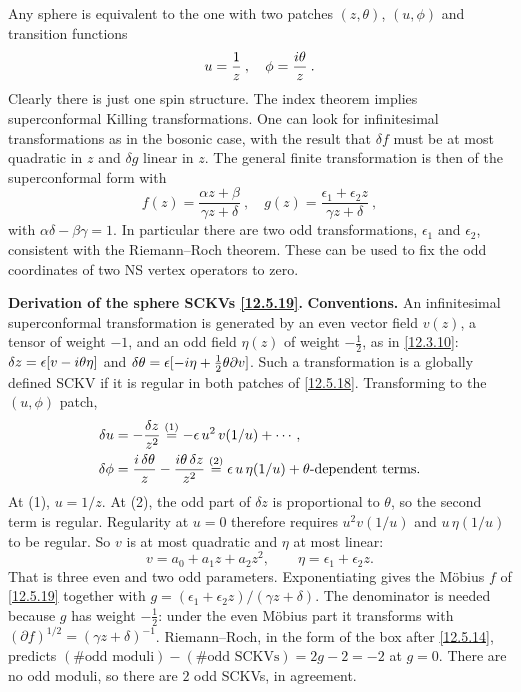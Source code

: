 Any sphere is equivalent to the one with two patches $(z,\theta)$, $(u,\phi)$ and transition functions
\begin{equation}
	u = \frac{1}{z} \:, \quad \phi = \frac{i\theta}{z} \:. \label{12.5.18}
\end{equation}
Clearly there is just one spin structure. The index theorem implies superconformal Killing transformations. One can look for infinitesimal transformations as in the bosonic case, with the result that $\delta f$ must be at most quadratic in $z$ and $\delta g$ linear in $z$. The general finite transformation is then of the superconformal form with
\begin{equation}
	f(z) = \frac{\alpha z + \beta}{\gamma z + \delta} \:, \quad g(z) = \frac{\epsilon_1 + \epsilon_2 z}{\gamma z + \delta} \:, \label{12.5.19}
\end{equation}
with $\alpha\delta - \beta\gamma = 1$. In particular there are two odd transformations, $\epsilon_1$ and $\epsilon_2$, consistent with the Riemann--Roch theorem. These can be used to fix the odd coordinates of two NS vertex operators to zero.

\begin{tcolorbox}[breakable]
	\begin{remark}
		\textbf{Derivation of the sphere SCKVs \eqref{12.5.19}.} \textbf{Conventions.} An infinitesimal superconformal transformation is generated by an even vector field $v(z)$, a tensor of weight $-1$, and an odd field $\eta(z)$ of weight $-\frac12$, as in \eqref{12.3.10}: $\delta z=\epsilon[v-i\theta\eta]$ and $\delta\theta=\epsilon[-i\eta+\frac12\theta\partial v]$. Such a transformation is a globally defined SCKV if it is regular in both patches of \eqref{12.5.18}. Transforming to the $(u,\phi)$ patch,
		\begin{align*}
			\delta u&=-\frac{\delta z}{z^{2}}\overset{(1)}{=} -\epsilon\,u^{2}\,v(1/u)+\cdots ,\\
			\delta\phi&=\frac{i\,\delta\theta}{z}-\frac{i\theta\,\delta z}{z^{2}}\overset{(2)}{=} \epsilon\,u\,\eta(1/u)+\theta\text{-dependent terms} .
		\end{align*}
		At (1), $u=1/z$. At (2), the odd part of $\delta z$ is proportional to $\theta$, so the second term is regular. Regularity at $u=0$ therefore requires $u^{2}v(1/u)$ and $u\,\eta(1/u)$ to be regular. So $v$ is at most quadratic and $\eta$ at most linear:
		\[
		v=a_{0}+a_{1}z+a_{2}z^{2},\qquad \eta=\epsilon_{1}+\epsilon_{2}z .
		\]
		That is three even and two odd parameters. Exponentiating gives the Möbius $f$ of \eqref{12.5.19} together with $g=(\epsilon_{1}+\epsilon_{2}z)/(\gamma z+\delta)$. The denominator is needed because $g$ has weight $-\frac12$: under the even Möbius part it transforms with $(\partial f)^{1/2}=(\gamma z+\delta)^{-1}$. Riemann--Roch, in the form of the box after \eqref{12.5.14}, predicts $(\#\text{odd moduli})-(\#\text{odd SCKVs})=2g-2=-2$ at $g=0$. There are no odd moduli, so there are $2$ odd SCKVs, in agreement.
	\end{remark}
\end{tcolorbox}


